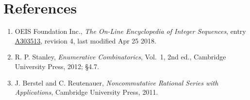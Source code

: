 \documentclass[11pt]{article}
\theoremstyle{definition}
\begin{document}
\section{References}

\begin{enumerate}

\item OEIS Foundation Inc., \emph{The On-Line Encyclopedia of Integer Sequences}, entry \href{https://oeis.org/A303513}{A303513}, revision 4, last modified Apr 25 2018.

\item R. P. Stanley, \emph{Enumerative Combinatorics}, Vol.~1, 2nd ed., Cambridge University Press, 2012; \S4.7.

\item J. Berstel and C. Reutenauer, \emph{Noncommutative Rational Series with Applications}, Cambridge University Press, 2011.

\end{enumerate}
\end{document}
